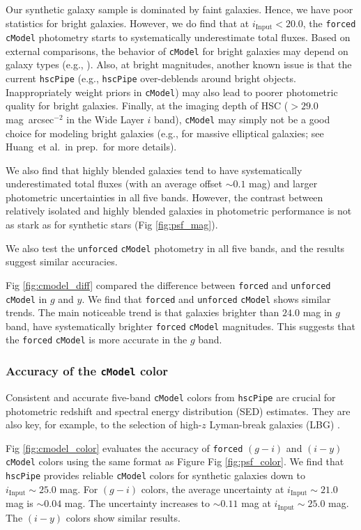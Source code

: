 \documentclass[useamsfonts]{pasj01}
\def\sb{mag~arcsec$^{-2}$}
\def\etal{{\ et al.~}}
\def\hscpipe{\texttt{hscPipe}}
\def\cmodel{\texttt{cModel}}
\def\forced{\texttt{forced}}
\def\unforced{\texttt{unforced}}
\begin{document}
Our synthetic galaxy sample is dominated by faint galaxies.  Hence, we have poor statistics for bright galaxies. However, we do find that at $i_{\mathrm{Input}}<20.0$, the \forced{} \cmodel{} photometry starts to systematically underestimate total fluxes. Based on external comparisons, the behavior of \cmodel{} for bright galaxies may 
    depend on galaxy types (e.g., \citealt{HSCDR1}).  Also, at bright magnitudes, another known issue is that the current \hscpipe{} (e.g., \hscpipe{} over-deblends around bright 
    objects. Inappropriately weight priors in \cmodel{}) may also lead to poorer photometric quality for bright galaxies.  Finally, at the imaging depth of HSC ($>29.0$\sb{} in the Wide Layer $i$ band),  \cmodel{} may simply not be a good choice for modeling bright 
    galaxies (e.g., for massive elliptical galaxies; see Huang\etal in prep.~for 
    more details).

We also find that highly blended galaxies tend to have systematically underestimated total 
    fluxes (with an average offset ${\sim}0.1$ mag) and larger photometric uncertainties in all five bands. However,  the contrast between relatively isolated and highly blended galaxies
    in photometric performance is not as stark as for synthetic
    stars (Fig \ref{fig:psf_mag}).

    We also test the \unforced{} \cmodel{} photometry in all five bands, and the
    results suggest similar accuracies.
    
    Fig \ref{fig:cmodel_diff} compared the difference between  \forced{} and \unforced{} \cmodel{} in $g$ and $y$.  We find that  \forced{} and \unforced{} \cmodel{} shows similar trends.  The main  noticeable trend is that galaxies brighter than $24.0$ mag in $g$ band, have systematically brighter \forced{} \cmodel{} magnitudes. This suggests that the \forced{} \cmodel{} is more accurate in the $g$ band.

\subsubsection{Accuracy of the \cmodel{} color}

    Consistent and accurate five-band \cmodel{} colors from \hscpipe{} are crucial  for photometric redshift and spectral energy distribution (SED) estimates. They are also key, for example, to the selection of high-$z$ Lyman-break galaxies (LBG) .

    Fig \ref{fig:cmodel_color} evaluates the  accuracy of \forced{} $(g-i)$ and $(i-y)$ \cmodel{} colors using the same format as Figure Fig \ref{fig:psf_color}. We find that \hscpipe{} provides reliable \cmodel{} colors for synthetic 
    galaxies down to $i_{\mathrm{Input}}{\sim}25.0$ mag.
    For $(g-i)$ colors, the average uncertainty at $i_{\mathrm{Input}}{\sim}21.0$ mag
    is ${\sim}0.04$ mag.
    The uncertainty increases to ${\sim}0.11$ mag at $i_{\mathrm{Input}}{\sim}25.0$ mag.
    The $(i-y)$ colors show similar results. 
\end{document}
